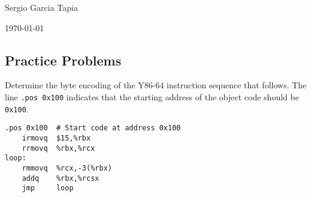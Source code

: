 \documentclass[12pt]{article}
\newenvironment{ex}[2][Exercise]{\begin{trivlist}
		\item[\hskip \labelsep {\bfseries #1}\hskip \labelsep {\bfseries #2.}]}{\end{trivlist}}
\begin{document}

\noindent Sergio Garcia Tapia \hfill

 \hfill

\noindent\today

\subsection*{Practice Problems}

\begin{ex}{4.1}
	Determine the byte encoding of the Y86-64 instruction sequence that follows.
	The line \texttt{.pos 0x100} indicates that the starting address of the object
	code should be \texttt{0x100}.
	
	\begin{lstlisting}[language={}]
.pos 0x100	# Start code at address 0x100
	irmovq	$15,%rbx
	rrmovq	%rbx,%rcx
loop:
	rmmovq	%rcx,-3(%rbx)
	addq	%rbx,%rcsx
	jmp		loop
	\end{lstlisting}
\end{ex}
\end{document}
